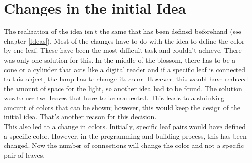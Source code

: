 \documentclass[00_doc.tex]{subfiles}
\begin{document}
    \section{Changes in the initial Idea}
    \begin{flushleft}
        The realization of the idea isn't the same that has been defined beforehand (see chapter 
        \ref{Ideas}). Most of the changes have to do with the idea to define the color by one 
        leaf. These have been the most difficult task and couldn't achieve. There was only one 
        solution for this. In the middle of the blossom, there has to be a cone or a cylinder 
        that acts like a digital reader and if a specific leaf is connected to this object, the 
        lamp has to change its color. However, this would have reduced the amount of space for 
        the light, so another idea had to be found. The solution was to use two leaves that 
        have to be connected. This leads to a shrinking amount of colors that can be shown; 
        however, this would keep the design of the initial idea. That's another reason for this 
        decision.\\

        This also led to a change in colors. Initially, specific leaf pairs would have defined 
        a specific color. However, in the programming and building process, this has been 
        changed. Now the number of connections will change the color and not a specific pair
        of leaves.        
    \end{flushleft}
\end{document}
